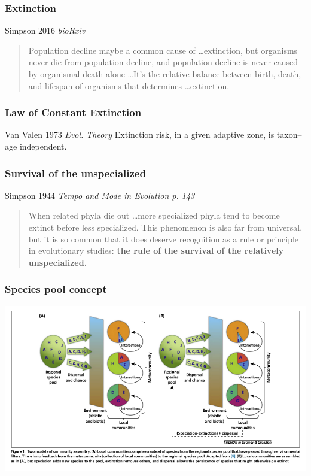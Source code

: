 \documentclass{beamer}
\begin{document}
\begin{frame}
  \frametitle{Extinction}


  \begin{block}{Simpson 2016 \em{bioRxiv}}
    \begin{quote}
      Population decline maybe a common cause of \dots extinction, but organisms never die from population decline, and population decline is never caused by organismal death alone \dots It's the relative balance between birth, death, and lifespan of organisms that determines \dots extinction. 
    \end{quote}
  \end{block}

\end{frame}

\begin{frame}
  \frametitle{Law of Constant Extinction}

  \begin{alertblock}{Van Valen 1973 \em{Evol. Theory}}
    Extinction risk, in a given adaptive zone, is taxon--age independent.
  \end{alertblock}

\end{frame}

\begin{frame}
  \frametitle{Survival of the unspecialized}
  \begin{block}{Simpson 1944 \em{Tempo and Mode in Evolution} p. 143}
    \begin{quote}
      When related phyla die out \dots more specialized phyla tend to become extinct before less specialized. This phenomenon is also far from universal, but it is so common that it does deserve recognition as a rule or principle in evolutionary studies: \textbf{the rule of the survival of the relatively unspecialized.}
    \end{quote}
  \end{block}

\end{frame}


\begin{frame}
  \frametitle{Species pool concept}

  \begin{center}
    \includegraphics[height=0.8\textheight,width=\textwidth,keepaspectratio=true]{figure/schemske_pool}
  \end{center}

\end{frame}
\end{document}
